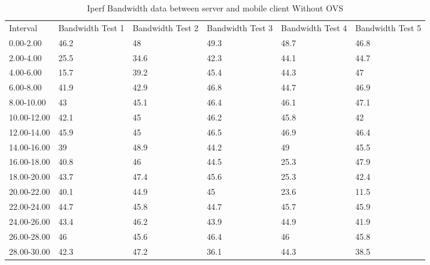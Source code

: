 \begin{sidewaystable}[]
	\centering
	\caption{Iperf Bandwidth data between server and mobile client Without OVS}
	\label{tab:iperf_server_mob_no_ovs}
	\begin{tabular}{llllll}
		Interval    & Bandwidth Test 1 & Bandwidth Test 2 & Bandwidth Test 3 & Bandwidth Test 4 & Bandwidth Test 5 \\
		0.00-2.00   & 46.2             & 48               & 49.3             & 48.7             & 46.8             \\
		2.00-4.00   & 25.5             & 34.6             & 42.3             & 44.1             & 44.7             \\
		4.00-6.00   & 15.7             & 39.2             & 45.4             & 44.3             & 47               \\
		6.00-8.00   & 41.9             & 42.9             & 46.8             & 44.7             & 46.9             \\
		8.00-10.00  & 43               & 45.1             & 46.4             & 46.1             & 47.1             \\
		10.00-12.00 & 42.1             & 45               & 46.2             & 45.8             & 42               \\
		12.00-14.00 & 45.9             & 45               & 46.5             & 46.9             & 46.4             \\
		14.00-16.00 & 39               & 48.9             & 44.2             & 49               & 45.5             \\
		16.00-18.00 & 40.8             & 46               & 44.5             & 25.3             & 47.9             \\
		18.00-20.00 & 43.7             & 47.4             & 45.6             & 25.3             & 42.4             \\
		20.00-22.00 & 40.1             & 44.9             & 45               & 23.6             & 11.5             \\
		22.00-24.00 & 44.7             & 45.8             & 44.7             & 45.7             & 45.9             \\
		24.00-26.00 & 43.4             & 46.2             & 43.9             & 44.9             & 41.9             \\
		26.00-28.00 & 46               & 45.6             & 46.4             & 46               & 45.8             \\
		28.00-30.00 & 42.3             & 47.2             & 36.1             & 44.3             & 38.5             \\

\end{tabular}
\end{sidewaystable}
